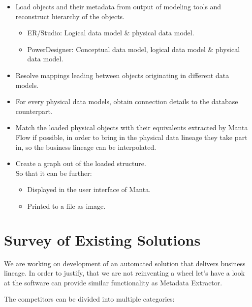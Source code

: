 \begin{itemize}
	\item Load objects and their metadata from output of modeling tools and reconstruct hierarchy of the objects.
	\begin{itemize}
		\item ER/Studio: Logical data model \& physical data model.
		\item PowerDesigner:  Conceptual data model, logical data model \& physical data model.
	\end{itemize}
	\item Resolve mappings leading between objects originating in different data models.
	\item For every physical data models, obtain connection details to the database counterpart.
	\item Match the loaded physical objects with their equivalents extracted by Manta Flow if possible, in order to bring in the physical data lineage they take part in, so the business lineage can be interpolated.
	\item Create a graph out of the loaded structure. \\
	So that it can be further:
	\begin{itemize}
		\item Displayed in the user interface of Manta.
		\item Printed to a file as image.
	\end{itemize}
\end{itemize}


\section{Survey of Existing Solutions}

We are working on development of an automated solution that delivers business lineage.
In order to justify, that we are not reinventing a wheel let's have a look at the software can provide similar functionality as Metadata Extractor.

The competitors can be divided into multiple categories:

